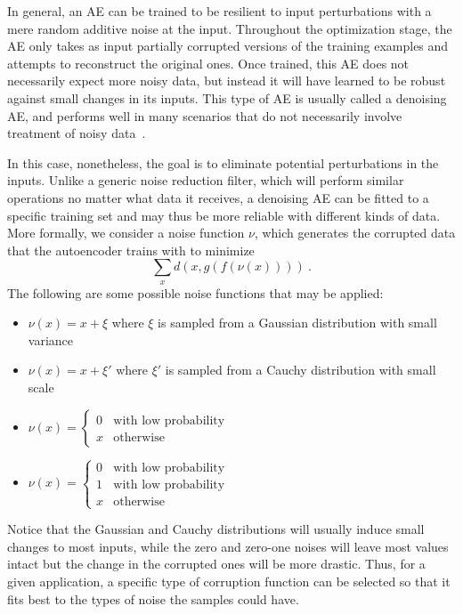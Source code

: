 \documentclass[
	fontsize=11pt, %
	twoside=false, %
	open=any, %
	secnumdepth=1, %
]{kaobook}
\begin{document}
In general, an AE can be trained to be resilient to input perturbations with a  mere random additive noise at the input. Throughout the optimization stage, the AE only takes as input partially corrupted versions of the training examples and attempts to reconstruct the original ones. Once trained, this AE does not necessarily expect more noisy data, but instead it will have learned to be robust against small changes in its inputs. This type of AE is usually called a denoising AE, and performs well in many scenarios that do not necessarily involve treatment of noisy data~\cite{sdae}.

In this case, nonetheless, the goal is to eliminate potential perturbations in the inputs. Unlike a generic noise reduction filter, which will perform similar operations no matter what data it receives, a denoising AE can be fitted to a specific training set and may thus be more reliable with different kinds of data. More formally, we consider a noise function $\nu$, which generates the corrupted data that the autoencoder trains with to minimize \[\sum_x d(x, g(f(\nu(x))))~.\] The following are some possible noise functions that may be applied:

\begin{itemize}
    \item $\nu(x)=x+\xi$ where $\xi$ is sampled from a Gaussian distribution with small variance
    \item $\nu(x)=x+\xi'$ where $\xi'$ is sampled from a Cauchy distribution with small scale
    \item $\nu(x)=\begin{cases}
        0&\mbox{with low probability}\\x&\mbox{otherwise}
    \end{cases}$
    \item $\nu(x)=\begin{cases}
        0&\mbox{with low probability}\\1&\mbox{with low probability}\\x&\mbox{otherwise}
    \end{cases}$
\end{itemize}

Notice that the Gaussian and Cauchy distributions will usually induce small changes to most inputs, while the zero and zero-one noises will leave most values intact but the change in the corrupted ones will be more drastic. Thus, for a given application, a specific type of corruption function can be selected so that it fits best to the types of noise the samples could have.
\end{document}
